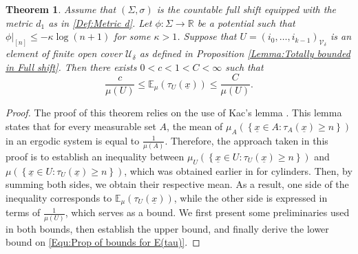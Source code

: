 \documentclass[11pt, reqno]{amsart}
\theoremstyle{plain}%
\newtheorem{theorem}{Theorem}[section]
\theoremstyle{definition}
\theoremstyle{definition}
\def\R{\ensuremath{\mathbb R}}
\def\E{\mathbb E}
\def\st{such that }
\def\ulx{\underline{x}}
\numberwithin{equation}{section}
\begin{document}
\begin{theorem}\label{Lemma: upper bound for E(hitting time)}
Assume that $(\Sigma,\sigma)$ is the countable full shift equipped with the metric $d_1$ as in \eqref{Def:Metric d}. Let $\phi:\Sigma\to\R$ be a potential \st $\phi\big|_{[n]}\le -\kappa\log (n+1)$ for some $\kappa>1$. Suppose that $ U=(i_0,\ldots,i_{k-1})_{\mathcal{V}_\delta}$ is an element of finite open cover $\mathcal{U}_\delta$ as defined in Proposition \ref{Lemma:Totally bounded in Full shift}. Then there exists $0<c<1<C<\infty$ such that 
\begin{equation}\label{Equ:Prop of bounds for E(tau)}
\frac{c}{\mu( U)} \le\E_\mu\left(\tau_{U}(\ulx)\right)\le \frac{C}{\mu( U)}.\end{equation}
\end{theorem}
\begin{proof}
 The proof of this theorem relies on the use of Kac's lemma \cite[Lemma 2$'$]{Kac47}. This lemma states that for every measurable set $A$, the mean of $\mu_A \left( \left\{\ulx\in A: \tau_A(\ulx)\ge n \right\}\right)$ in an ergodic system is equal to $\frac{1}{\mu(A)}$. Therefore, the approach taken in this proof is to establish an inequality between $\mu_U \left( \left\{\ulx\in U: \tau_U(\ulx)\ge n \right\}\right)$ and $\mu \left( \left\{\ulx\in U: \tau_U(\ulx)\ge n \right\}\right)$, which was obtained earlier in \cite[Proposition 3.1]{MikeNatali} for cylinders. Then, by summing both sides, we obtain their respective mean. As a result, one side of the inequality corresponds to $\E_\mu(\tau_U(\ulx))$, while the other side is expressed in terms of $\frac{1}{\mu(U)}$, which serves as a bound. We first present some preliminaries used in both bounds, then establish the upper bound, and finally derive the lower bound on \eqref{Equ:Prop of bounds for E(tau)}.




\end{proof}
\end{document}

